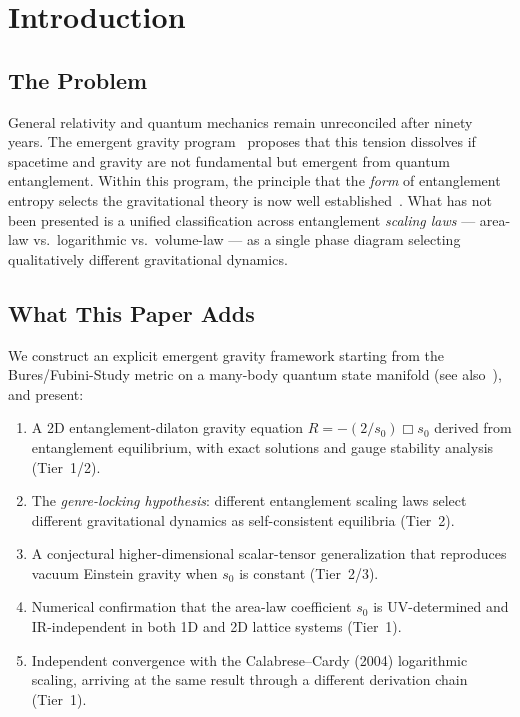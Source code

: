 \documentclass[aps,prd,twocolumn,superscriptaddress,nofootinbib,floatfix]{revtex4-2}
\newcommand{\sn}{s_0}
\newcommand{\dAlem}{\Box}
\begin{document}
\section{Introduction}
\label{sec:intro}

\subsection{The Problem}

General relativity and quantum mechanics remain unreconciled after ninety years. The emergent gravity program~\cite{Jacobson1995,Jacobson2016,VanRaamsdonk2010,Swingle2012,Verlinde2011,LewkowyczMaldacena2013,MaldacenaSusskind2013} proposes that this tension dissolves if spacetime and gravity are not fundamental but emergent from quantum entanglement. Within this program, the principle that the \emph{form} of entanglement entropy selects the gravitational theory is now well established~\cite{Faulkner2014,Swingle2014,Haehl2018}. What has not been presented is a unified classification across entanglement \emph{scaling laws} --- area-law vs.\ logarithmic vs.\ volume-law --- as a single phase diagram selecting qualitatively different gravitational dynamics.

\subsection{What This Paper Adds}

We construct an explicit emergent gravity framework starting from the Bures/Fubini-Study metric on a many-body quantum state manifold (see also~\cite{Matsueda2013}), and present:

\begin{enumerate}
\item A 2D entanglement-dilaton gravity equation $R = -(2/\sn)\dAlem\sn$ derived from entanglement equilibrium, with exact solutions and gauge stability analysis (Tier~1/2).
\item The \emph{genre-locking hypothesis}: different entanglement scaling laws select different gravitational dynamics as self-consistent equilibria (Tier~2).
\item A conjectural higher-dimensional scalar-tensor generalization that reproduces vacuum Einstein gravity when $\sn$ is constant (Tier~2/3).
\item Numerical confirmation that the area-law coefficient $\sn$ is UV-determined and IR-independent in both 1D and 2D lattice systems (Tier~1).
\item Independent convergence with the Calabrese--Cardy (2004) logarithmic scaling, arriving at the same result through a different derivation chain (Tier~1).
\end{enumerate}
\end{document}
